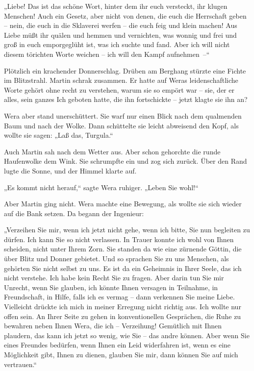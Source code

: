 „Liebe! Das ist das schöne Wort, hinter dem ihr euch versteckt, ihr
klugen Menschen! Auch ein Gesetz, aber nicht von denen, die euch
die Herrschaft geben – nein, die euch in die Sklaverei werfen – die
euch feig und klein machen! Aus Liebe müßt ihr quälen und hemmen
und vernichten, was wonnig und frei und groß in euch emporgeglüht
ist, was ich suchte und fand. Aber ich will nicht diesem törichten
Worte weichen – ich will den Kampf aufnehmen~–“

Plötzlich ein krachender Donnerschlag. Drüben am Berghang stürzte
eine Fichte im Blitzstrahl. Martin schrak zusammen. Er hatte auf
Weras leidenschaftliche Worte gehört ohne recht zu verstehen, warum
sie so empört war – sie, der er alles, sein ganzes Ich geboten
hatte, die ihn fortschickte – jetzt klagte sie ihn an?

Wera aber stand unerschüttert. Sie warf nur einen Blick nach dem
qualmenden Baum und nach der Wolke. Dann schüttelte sie leicht
abweisend den Kopf, als wollte sie sagen: „Laß das, Turgula.“

Auch Martin sah nach dem Wetter aus. Aber schon gehorchte die runde
Haufenwolke dem Wink. Sie schrumpfte ein und zog sich zurück. Über
den Rand lugte die Sonne, und der Himmel klarte auf.

„Es kommt nicht herauf,“ sagte Wera ruhiger. „Leben Sie wohl!“

Aber Martin ging nicht. Wera machte eine Bewegung, als wollte sie
sich wieder auf die Bank setzen. Da begann der Ingenieur:

„Verzeihen Sie mir, wenn ich jetzt nicht gehe, wenn ich bitte, Sie
nun begleiten zu dürfen. Ich kann Sie so nicht verlassen. In Trauer
konnte ich wohl von Ihnen scheiden, nicht unter Ihrem Zorn. Sie
standen da wie eine zürnende Göttin, die über Blitz und Donner
gebietet. Und so sprachen Sie zu uns Menschen, als gehörten Sie
nicht selbst zu uns. Es ist da ein Geheimnis in Ihrer Seele, das
ich nicht verstehe. Ich habe kein Recht Sie zu fragen. Aber darin
tun Sie mir Unrecht, wenn Sie glauben, ich könnte Ihnen versagen in
Teilnahme, in Freundschaft, in Hilfe, falls ich es vermag – dann
verkennen Sie meine Liebe. Vielleicht drückte ich mich in meiner
Erregung nicht richtig aus. Ich wollte nur offen sein. An Ihrer
Seite zu gehen in konventionellen Gesprächen, die Ruhe zu bewahren
neben Ihnen Wera, die ich – Verzeihung! Gemütlich mit Ihnen
plaudern, das kann ich jetzt so wenig, wie Sie – das andre können.
Aber wenn Sie eines Freundes bedürfen, wenn Ihnen ein Leid
widerfahren ist, wenn es eine Möglichkeit gibt, Ihnen zu dienen,
glauben Sie mir, dann können Sie auf mich vertrauen.“

